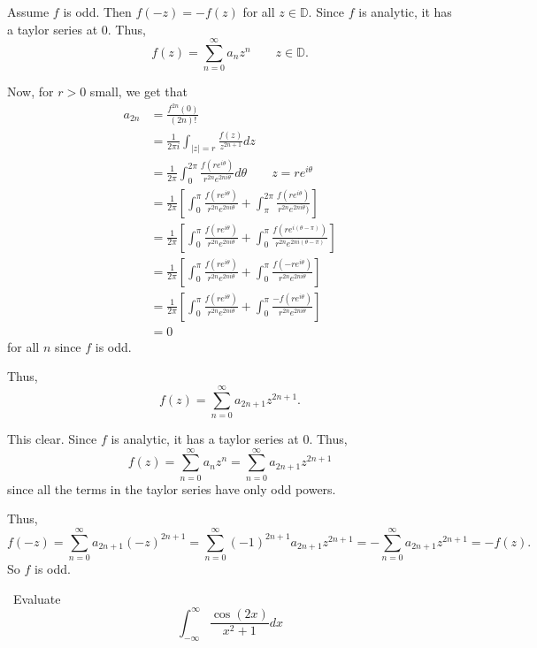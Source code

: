 \documentclass[12pt]{Homework}
\begin{document}
\begin{solution}$\,$

\boxed{\implies} Assume $f$ is odd. Then $f(-z)=-f(z)$ for all $z\in\mathbb{D}$. Since $f$ is analytic, it has a taylor series at $0$. Thus, $$f(z)=\sum_{n=0}^\infty a_nz^n\qquad z\in\mathbb{D}.$$

Now, for $r>0$ small, we get that \begin{align*}
    a_{2n}&=\frac{f^{2n}(0)}{(2n)!}\\
    &=\frac{1}{2\pi i}\int_{|z|=r}\frac{f(z)}{z^{2n+1}}dz\\
    &=\frac{1}{2\pi}\int_0^{2\pi}\frac{f(re^{i\theta})}{r^{2n}e^{2ni\theta}}d\theta\qquad z=re^{i\theta}\\
    &=\frac{1}{2\pi}\left[\int_0^\pi\frac{f(re^{i\theta})}{r^{2n}e^{2ni\theta}}+\int_\pi^{2\pi}\frac{f(re^{i\theta})}{r^{2n}e^{2ni\theta})}\right]\\
    &=\frac{1}{2\pi}\left[\int_0^\pi\frac{f(re^{i\theta})}{r^{2n}e^{2ni\theta}}+\int_0^\pi\frac{f(re^{i(\theta-\pi)})}{r^{2n}e^{2ni(\theta-\pi)}}\right]\\
    &=\frac{1}{2\pi}\left[\int_0^\pi\frac{f(re^{i\theta})}{r^{2n}e^{2ni\theta}}+\int_0^\pi\frac{f(-re^{i\theta})}{r^{2n}e^{2ni\theta}}\right]\\
    &=\frac{1}{2\pi}\left[\int_0^\pi\frac{f(re^{i\theta})}{r^{2n}e^{2ni\theta}}+\int_0^\pi\frac{-f(re^{i\theta})}{r^{2n}e^{2ni\theta}}\right]\\
    &=0
\end{align*} for all $n$ since $f$ is odd.

Thus, $$f(z)=\sum_{n=0}^\infty a_{2n+1}z^{2n+1}.$$

\boxed{\impliedby} This clear. Since $f$ is analytic, it has a taylor series at $0$. Thus, $$f(z)=\sum_{n=0}^\infty a_nz^n=\sum_{n=0}^\infty a_{2n+1}z^{2n+1}$$ since all the terms in the taylor series have only odd powers.

Thus, $$f(-z)=\sum_{n=0}^\infty a_{2n+1}(-z)^{2n+1}=\sum_{n=0}^\infty (-1)^{2n+1}a_{2n+1}z^{2n+1}=-\sum_{n=0}^\infty a_{2n+1}z^{2n+1}=-f(z).$$ So $f$ is odd.
\end{solution}
\newpage




\begin{problem} $\,$
Evaluate $$\int_{-\infty}^\infty\frac{\cos(2x)}{x^2+1}dx$$
\end{problem}
\end{document}
